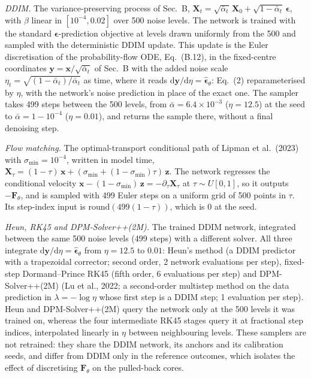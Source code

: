 \textit{DDIM.} The variance-preserving process of Sec.~B,
$\boldsymbol{X}_t = \sqrt{\bar\alpha_t}\, \boldsymbol{X}_0 + \sqrt{1 - \bar\alpha_t}\, \boldsymbol{\epsilon}$,
with $\beta$ linear in $[10^{-4}, 0.02]$ over 500 noise levels. The network is trained with the
standard $\boldsymbol{\epsilon}$-prediction objective at levels drawn uniformly from the 500 and
sampled with the deterministic DDIM update. This update is the Euler discretisation of the
probability-flow ODE, Eq.~(B.12), in the fixed-centre coordinates
$\boldsymbol{y} = \boldsymbol{x}/\sqrt{\bar\alpha_t}$ of Sec.~B with the added noise scale
$\eta_t = \sqrt{(1 - \bar\alpha_t)/\bar\alpha_t}$ as time, where it reads
$\mathrm{d}\boldsymbol{y}/\mathrm{d}\eta = \hat{\boldsymbol{\epsilon}}_\theta$: Eq.~(2)
reparameterised by $\eta$, with the network's noise prediction in place of the exact one. The
sampler takes 499 steps between the 500 levels, from $\bar\alpha = 6.4\times10^{-3}$
($\eta = 12.5$) at the seed to $\bar\alpha = 1 - 10^{-4}$ ($\eta = 0.01$), and returns the sample
there, without a final denoising step.

\textit{Flow matching.} The optimal-transport conditional path of Lipman et al.~(2023) with
$\sigma_{\min} = 10^{-4}$, written in model time,
$\boldsymbol{X}_\tau = (1 - \tau)\, \boldsymbol{x} + (\sigma_{\min} + (1 - \sigma_{\min})\tau)\, \boldsymbol{z}$.
The network regresses the conditional velocity
$\boldsymbol{x} - (1 - \sigma_{\min})\,\boldsymbol{z} = -\partial_\tau \boldsymbol{X}_\tau$ at
$\tau \sim U[0, 1]$, so it outputs $-\boldsymbol{F}_\theta$, and is sampled with 499 Euler steps on a
uniform grid of 500 points in $\tau$. Its step-index input is $\mathrm{round}(499(1 - \tau))$, which
is $0$ at the seed.

\textit{Heun, RK45 and DPM-Solver++(2M).} The trained DDIM network, integrated between the same
500 noise levels (499 steps) with a different solver. All three integrate
$\mathrm{d}\boldsymbol{y}/\mathrm{d}\eta = \hat{\boldsymbol{\epsilon}}_\theta$ from $\eta = 12.5$ to
$0.01$: Heun's method (a DDIM predictor with a trapezoidal corrector; second order, 2 network
evaluations per step), fixed-step Dormand--Prince RK45 (fifth order, 6 evaluations per step) and
DPM-Solver++(2M) (Lu et al., 2022; a second-order multistep method on the data prediction in
$\lambda = -\log\eta$ whose first step is a DDIM step; 1 evaluation per step). Heun and
DPM-Solver++(2M) query the network only at the 500 levels it was trained on, whereas the four
intermediate RK45 stages query it at fractional step indices, interpolated linearly in $\eta$
between neighbouring levels. These samplers are not retrained: they share the DDIM network, its
anchors and its calibration seeds, and differ from DDIM only in the reference outcomes, which
isolates the effect of discretising $\boldsymbol{F}_\theta$ on the pulled-back cores.

